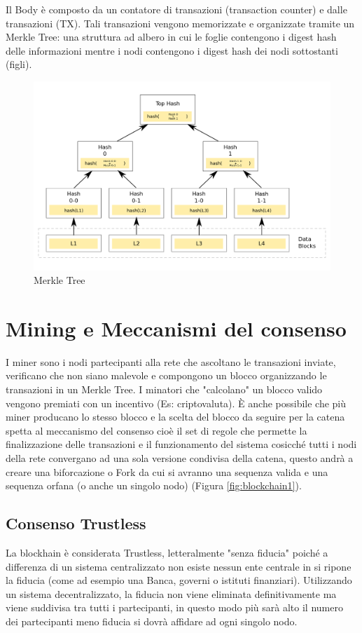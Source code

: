 \documentclass[11pt,a4paper,titlepage]{report}
\begin{document}
Il Body è composto da un contatore di transazioni (transaction counter) e dalle transazioni (TX). Tali transazioni vengono memorizzate e organizzate tramite un Merkle Tree: una struttura ad albero in cui le foglie contengono i digest hash delle informazioni mentre i nodi contengono i digest hash dei nodi sottostanti (figli).
\begin{figure}[h]
	\includegraphics[width=\textwidth]{Hash_Tree}
	\centering
	\caption{Merkle Tree}
	\label{fig:Tree1}
\end{figure}

\section{Mining e Meccanismi del consenso}
I miner sono i nodi partecipanti alla rete che  ascoltano le transazioni inviate, verificano che non siano malevole e compongono un blocco organizzando le transazioni in un Merkle Tree.
I minatori che "calcolano" un blocco valido vengono premiati con un incentivo (Es: criptovaluta).
È anche possibile che più miner producano lo stesso blocco e la scelta del blocco da seguire per la catena spetta al meccanismo del consenso cioè il set di regole che permette la finalizzazione delle transazioni e il funzionamento del sistema cosicché tutti i nodi della rete convergano ad una sola versione condivisa della catena, questo andrà a creare una biforcazione o Fork da cui si avranno una sequenza valida e una sequenza orfana (o anche un singolo nodo) (Figura \ref{fig:blockchain1}).

\subsection{Consenso Trustless}
La blockhain è considerata Trustless, letteralmente "senza fiducia" poiché a differenza di un sistema centralizzato non esiste nessun ente centrale in si ripone la fiducia (come ad esempio una Banca, governi o istituti finanziari). Utilizzando un sistema decentralizzato, la fiducia non viene eliminata definitivamente ma viene suddivisa tra tutti i partecipanti, in questo modo più sarà alto il numero dei partecipanti meno fiducia si dovrà affidare ad ogni singolo nodo. %
\end{document}

